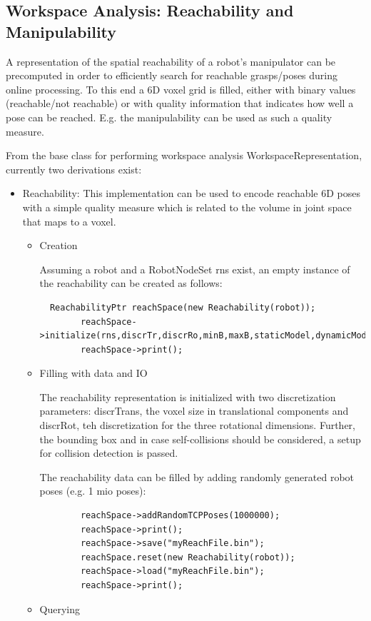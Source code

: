 \subsection{Workspace Analysis: Reachability and Manipulability}
 A representation of the spatial reachability of a robot's manipulator can be precomputed in order to efficiently search for reachable grasps/poses during online processing. To this end a 6D voxel grid is filled, either with binary values (reachable/not reachable) or with quality information that indicates how well a pose can be reached. E.g. the manipulability can be used as such a quality measure.
\par
From the base class for performing workspace analysis WorkspaceRepresentation, currently two derivations exist: 
\begin{itemize}
\item Reachability: This implementation can be used to encode reachable 6D poses with a simple quality measure which is related to the volume in joint space that maps to a voxel.
\begin{itemize}
\item Creation \par
Assuming a robot and a RobotNodeSet rns exist, an empty instance of the reachability can be created as follows:
\begin{lstlisting}
  ReachabilityPtr reachSpace(new Reachability(robot));
        reachSpace->initialize(rns,discrTr,discrRo,minB,maxB,staticModel,dynamicModel,baseNode,tcpNode);
        reachSpace->print();
\end{lstlisting}
\item Filling with data and IO  \par
 The reachability representation is initialized with two discretization parameters: discrTrans, the voxel size in translational components and discrRot, teh discretization for the three rotational dimensions. Further, the bounding box and in case self-collisions should be considered, a setup for collision detection is passed.\par
 The reachability data can be filled by adding randomly generated robot poses (e.g. 1 mio poses): 
 \begin{lstlisting}
        reachSpace->addRandomTCPPoses(1000000);
        reachSpace->print();
        reachSpace->save("myReachFile.bin");
        reachSpace.reset(new Reachability(robot));
        reachSpace->load("myReachFile.bin");
        reachSpace->print();
 \end{lstlisting}
 \item Querying  \par

\end{itemize}
\end{itemize}

